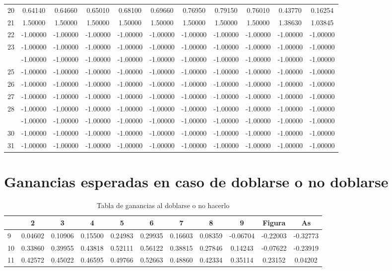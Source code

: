 \documentclass[12pt,a4paper,]{book}
\numberwithin{dummy}{section}
\theoremstyle{ocrenumbox}
\theoremstyle{blacknumex}
\theoremstyle{blacknumbox}
\theoremstyle{ocrenum}
\theoremstyle{ocrenum}
\begin{document}
\begin{longtable}[t]{lcccccccccc}
20 & 0.64140 & 0.64660 & 0.65010 & 0.68100 & 0.69660 & 0.76950 & 0.79150 & 0.76010 & 0.43770 & 0.16254\\
21 & 1.50000 & 1.50000 & 1.50000 & 1.50000 & 1.50000 & 1.50000 & 1.50000 & 1.50000 & 1.38630 & 1.03845\\
22 & -1.00000 & -1.00000 & -1.00000 & -1.00000 & -1.00000 & -1.00000 & -1.00000 & -1.00000 & -1.00000 & -1.00000\\
23 & -1.00000 & -1.00000 & -1.00000 & -1.00000 & -1.00000 & -1.00000 & -1.00000 & -1.00000 & -1.00000 & -1.00000\\
\addlinespace
24 & -1.00000 & -1.00000 & -1.00000 & -1.00000 & -1.00000 & -1.00000 & -1.00000 & -1.00000 & -1.00000 & -1.00000\\
25 & -1.00000 & -1.00000 & -1.00000 & -1.00000 & -1.00000 & -1.00000 & -1.00000 & -1.00000 & -1.00000 & -1.00000\\
26 & -1.00000 & -1.00000 & -1.00000 & -1.00000 & -1.00000 & -1.00000 & -1.00000 & -1.00000 & -1.00000 & -1.00000\\
27 & -1.00000 & -1.00000 & -1.00000 & -1.00000 & -1.00000 & -1.00000 & -1.00000 & -1.00000 & -1.00000 & -1.00000\\
28 & -1.00000 & -1.00000 & -1.00000 & -1.00000 & -1.00000 & -1.00000 & -1.00000 & -1.00000 & -1.00000 & -1.00000\\
\addlinespace
29 & -1.00000 & -1.00000 & -1.00000 & -1.00000 & -1.00000 & -1.00000 & -1.00000 & -1.00000 & -1.00000 & -1.00000\\
30 & -1.00000 & -1.00000 & -1.00000 & -1.00000 & -1.00000 & -1.00000 & -1.00000 & -1.00000 & -1.00000 & -1.00000\\
31 & -1.00000 & -1.00000 & -1.00000 & -1.00000 & -1.00000 & -1.00000 & -1.00000 & -1.00000 & -1.00000 & -1.00000\\
\bottomrule
\end{longtable}
\endgroup{}

\hypertarget{ganancias-esperadas-en-caso-de-doblarse-o-no-doblarse}{%
\section{Ganancias esperadas en caso de doblarse o no
doblarse}\label{ganancias-esperadas-en-caso-de-doblarse-o-no-doblarse}}

\begingroup\fontsize{12}{14}\selectfont

\begin{longtable}[t]{lcccccccccc}
\caption{\label{tab:unnamed-chunk-8}Tabla de ganancias al doblarse o no hacerlo}\\
\toprule
 & 2 & 3 & 4 & 5 & 6 & 7 & 8 & 9 & Figura & As\\
\midrule
9 & 0.04602 & 0.10906 & 0.15500 & 0.24983 & 0.29935 & 0.16603 & 0.08359 & -0.06704 & -0.22003 & -0.32773\\
10 & 0.33860 & 0.39955 & 0.43818 & 0.52111 & 0.56122 & 0.38815 & 0.27846 & 0.14243 & -0.07622 & -0.23919\\
11 & 0.42572 & 0.45022 & 0.46595 & 0.49766 & 0.52663 & 0.48860 & 0.42334 & 0.35114 & 0.23152 & 0.04202\\
\bottomrule
\end{longtable}
\endgroup{}
\end{document}
